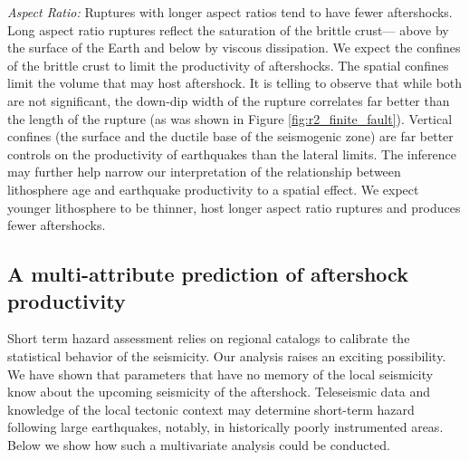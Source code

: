 \documentclass[12pt, notitlepage]{report}
\begin{document}
\textit{Aspect Ratio:} Ruptures with longer aspect ratios tend to have fewer aftershocks. Long aspect ratio ruptures reflect the saturation of the brittle crust--- above by the surface of the Earth and below by viscous dissipation. We expect the confines of the brittle crust to limit the productivity of aftershocks. The spatial confines limit the volume that may host aftershock. It is telling to observe that while both are not significant, the down-dip width of the rupture correlates far better than the length of the rupture (as was shown in Figure \ref{fig:r2_finite_fault}). Vertical confines (the surface and the ductile base of the seismogenic zone) are far better controls on the productivity of earthquakes than the lateral limits. The inference may further help narrow our interpretation of the relationship between lithosphere age and earthquake productivity to a spatial effect. We expect younger lithosphere to be thinner, host longer aspect ratio ruptures and produces fewer aftershocks. 

\subsection{A multi-attribute prediction of aftershock productivity}

Short term hazard assessment relies on regional catalogs to calibrate the statistical behavior of the seismicity. Our analysis raises an exciting possibility. We have shown that parameters that have no memory of the local seismicity know about the upcoming seismicity of the aftershock. Teleseismic data and knowledge of the local tectonic context may determine short-term hazard following large earthquakes, notably, in historically poorly instrumented areas. Below we show how such a multivariate analysis could be conducted. 
\end{document}
